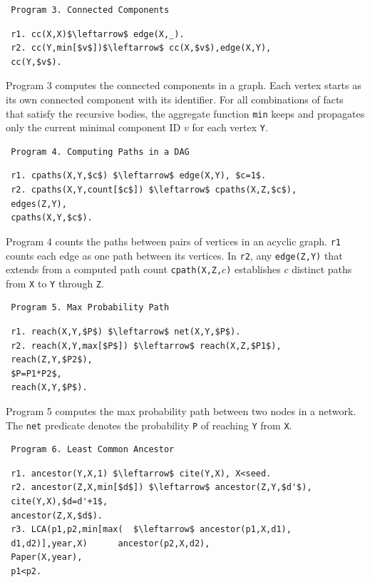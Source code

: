 \begin{appendix}
 \begin{verbatim}
 Program 3. Connected Components
 \end{verbatim}\vspace{-0.1in}\small
 \begin{lstlisting}
 r1. cc(X,X)$\leftarrow$ edge(X,_).
 r2. cc(Y,min[$v$])$\leftarrow$ cc(X,$v$),edge(X,Y),
 cc(Y,$v$).
 \end{lstlisting}
 \normalsize
 
 Program 3 computes the connected components in a graph. Each vertex starts as its own connected component with its identifier. For all combinations of facts that satisfy the recursive bodies, the aggregate function \texttt{min} keeps and propagates only the current minimal component ID $v$ for each vertex \texttt{Y}.
 
 \begin{verbatim}
 Program 4. Computing Paths in a DAG
 \end{verbatim}\vspace{-0.1in}\small
 \begin{lstlisting}
 r1. cpaths(X,Y,$c$) $\leftarrow$ edge(X,Y), $c=1$.
 r2. cpaths(X,Y,count[$c$]) $\leftarrow$ cpaths(X,Z,$c$),
 edges(Z,Y),
 cpaths(X,Y,$c$).
 \end{lstlisting}
 \normalsize
 
 Program 4 counts the paths between pairs of vertices in an acyclic graph. \texttt{r1} counts each edge as one path between its vertices. In \texttt{r2}, any \texttt{edge(Z,Y)} that extends from a computed path count \texttt{cpath(X,Z,$c$)} establishes $c$ distinct paths from \texttt{X} to \texttt{Y} through \texttt{Z}.
 
 
 \begin{verbatim}
 Program 5. Max Probability Path
 \end{verbatim}\vspace{-0.1in}\small
 \begin{lstlisting}
 r1. reach(X,Y,$P$) $\leftarrow$ net(X,Y,$P$).
 r2. reach(X,Y,max[$P$]) $\leftarrow$ reach(X,Z,$P1$),
 reach(Z,Y,$P2$),
 $P=P1*P2$,
 reach(X,Y,$P$).
 \end{lstlisting}
 \normalsize
 
 Program 5 \cite{7113340} computes the max probability path between two nodes in a network. The \texttt{net} predicate denotes the probability \texttt{P} of reaching \texttt{Y} from \texttt{X}.
 
 \begin{verbatim}
 Program 6. Least Common Ancestor
 \end{verbatim}\small
 \begin{lstlisting}
 r1. ancestor(Y,X,1) $\leftarrow$ cite(Y,X), X<seed.
 r2. ancestor(Z,X,min[$d$]) $\leftarrow$ ancestor(Z,Y,$d'$),
 cite(Y,X),$d=d'+1$,
 ancestor(Z,X,$d$).
 r3. LCA(p1,p2,min[max(  $\leftarrow$ ancestor(p1,X,d1),
 d1,d2)],year,X)      ancestor(p2,X,d2),
 Paper(X,year),
 p1<p2.
 \end{lstlisting}
 \normalsize
 

\end{appendix}
